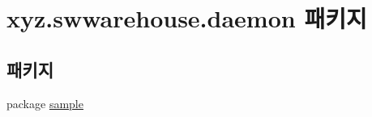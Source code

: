 \hypertarget{namespacexyz_1_1swwarehouse_1_1daemon}{\section{xyz.\-swwarehouse.\-daemon 패키지}
\label{namespacexyz_1_1swwarehouse_1_1daemon}
}
\subsection*{패키지}
\begin{DoxyCompactItemize}
\item 
package \hyperlink{namespacexyz_1_1swwarehouse_1_1daemon_1_1sample}{sample}
\end{DoxyCompactItemize}
